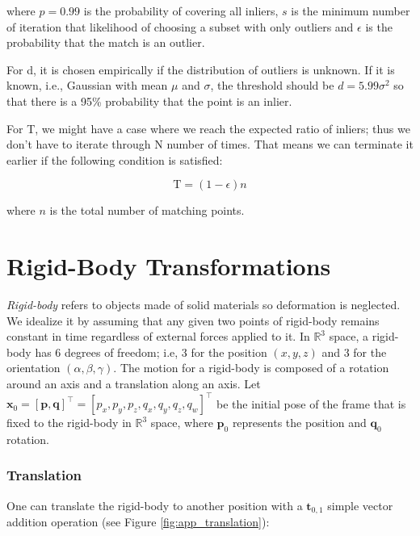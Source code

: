 \documentclass[12pt]{report}
\numberwithin{figure}{section}
\newcommand{\R}{\mathbb{R}}
\begin{document}
\begin{appendices}
where $p=0.99$ is the probability of covering all inliers, $s$ is the minimum 
number of iteration that likelihood of choosing a subset with only outliers 
and $\epsilon$ is the probability that the match is an outlier.

For d, it is chosen empirically if the distribution of outliers is unknown. If 
it is known, i.e., Gaussian with mean $\mu$ and $\sigma$, the threshold should 
be $d=5.99\sigma^2$ so that there is a 95\% probability that the point is an 
inlier.

For T, we might have a case where we reach the expected ratio of inliers; thus 
we don't have to iterate through N number of times. That means we can 
terminate it earlier if the following condition is satisfied:

\begin{equation}
\text{T} = (1-\epsilon)n
\end{equation}

where $n$ is the total number of matching points.

\section{Rigid-Body Transformations} \label{sc_rigid_body_transformations}

\textit{Rigid-body} refers to objects made of solid materials so deformation is 
neglected. We idealize it by assuming that any given two points of 
rigid-body remains constant in time regardless of external forces 
applied to it. In $\R^3$ space, a rigid-body has 6 degrees of freedom; i.e, 
3 for the position $(x, y, z)$ and 3 for the orientation $(\alpha, \beta, \gamma)$.
The motion for a rigid-body is composed of a rotation around an axis and 
a translation along an axis. 
Let
$\mathbf{x}_0=[\mathbf{p}, \mathbf{q}]^\top=[p_x, p_y, p_z, q_x, q_y, 
q_z, q_w]^\top$
be the initial pose of the frame that is fixed to the rigid-body in $\R^3$ space, 
where $\mathbf{p}_0$ represents the position and $\mathbf{q}_0$ rotation.

\subsubsection{Translation}

One can translate the rigid-body to another position with a 
$\mathbf{t}_{0,1}$ simple vector addition operation (see Figure 
\ref{fig:app_translation}):


\end{appendices}
\end{document}
